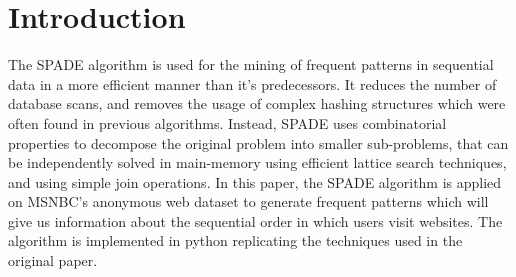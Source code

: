 \section{Introduction}

The SPADE \cite{b1} algorithm is used for the mining of frequent patterns in sequential data in a more efficient manner than it's predecessors. It reduces the number of database scans, and removes the usage of complex hashing structures which were often found in previous algorithms. Instead, SPADE uses combinatorial properties to decompose the original problem into smaller sub-problems, that can be independently solved in main-memory using efficient lattice search techniques, and using simple join operations. In this paper, the SPADE algorithm is applied on MSNBC's anonymous web dataset \cite{b2} to generate frequent patterns which will give us information about the sequential order in which users visit websites. The algorithm is implemented in python replicating the techniques used in the original paper.
